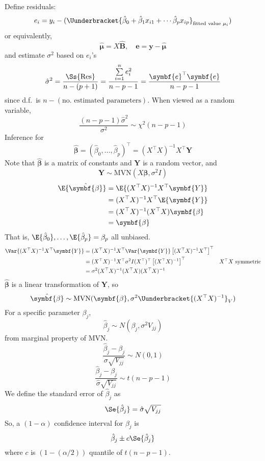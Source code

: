 Define residuals:
\[ e_i=y_i-(\Uunderbracket{\hat{\beta}_0+\hat{\beta}_1x_{i1}+\cdots\hat{\beta}_p x_{ip}
    }_{\text{fitted value }\mu_i}) \]
or equivalently,
\[ \hat{\symbf{\mu}}=X\hat{\symbf{B}},\quad \symbf{e}=\symbf{y}-\hat{\symbf{\mu}} \]
and estimate $ \sigma^2 $ based on $ e_i $'s
\[ \hat{\sigma}^2=\frac{\Ss{\text{Res}}}{n-(p+1)}=
    \frac{\sum\limits_{i=1}^{n} e_i^2}{n-p-1}=\frac{\symbf{e}^\top\symbf{e}}{n-p-1}  \]
since d.f.\ is $ n-(\text{no.\ estimated parameters}) $. When viewed
as a random variable,
\[ \frac{(n-p-1)\hat{\sigma}^2}{\sigma^2}\sim \chi^2(n-p-1)  \]
Inference for
\[ \hat{\symbf{\beta}}=(\hat{\beta}_0,\ldots,\hat{\beta}_p)^\top
    =(X^\top X)^{-1}X^\top \symbf{Y} \]
Note that $ \hat{\symbf{\beta}} $ is a matrix of constants and
$ \symbf{Y} $ is a random vector, and
\[ \symbf{Y}\sim \text{MVN}(X\symbf{\beta},\sigma^2 I) \]
\begin{align*}
    \E{\hat{\symbf{\beta}}}
     & =\E{(X^\top X)^{-1}X^\top \symbf{Y}}    \\
     & =(X^\top X)^{-1}X^\top\E{\symbf{Y}}     \\
     & =(X^\top X)^{-1}(X^\top X)\symbf{\beta} \\
     & =\symbf{\beta}
\end{align*}
That is, $ \E{\hat{\beta}_0},\ldots,\E{\hat{\beta}_p}=\beta_p $
all unbiased.
\begin{align*}
    \Var{(X^\top X)^{-1}X^\top\symbf{Y}}
     & =(X^\top X)^{-1}X^{\top}\Var{\symbf{Y}}\left[ (X^\top X)^{-1}X^\top \right]^\top                              \\
     & =(X^\top X)^{-1}X^\top \sigma^2 I(X^\top)^\top\left[ (X^\top X)^{-1} \right]^\top & X^\top X\text{ symmetric} \\
     & =\sigma^2(X^\top X)^{-1}(X^\top X)(X^\top X)^{-1}
\end{align*}
$ \hat{\symbf{\beta}} $ is a linear transformation of $ \symbf{Y} $, so
\[ \hat{\symbf{\beta}} \sim \text{MVN}(\symbf{\beta},\sigma^2
    \Uunderbracket{(X^\top X)^{-1}}_{V}) \]
For a specific parameter $ \beta_j $,
\[ \hat{\beta}_j \sim N(\beta_j,\sigma^2 V_{jj}) \]
from marginal property of MVN.\
\[ \frac{\hat{\beta}_j-\beta_j}{\sigma\sqrt{V_{jj}}} \sim N(0,1)  \]
\[ \frac{\hat{\beta}_j-\beta_j}{\hat{\sigma}\sqrt{V_{jj}}} \sim t(n-p-1)  \]
We define the standard error of $ \hat{\beta}_j $ as
\[ \Se{\hat{\beta}_j}=\hat{\sigma}\sqrt{V_{jj}} \]
So, a $ (1-\alpha) $ confidence interval for $ \beta_j $
is
\[ \hat{\beta}_j\pm c\Se{\hat{\beta}_j} \]
where $ c $ is $ (1-(\alpha/2)) $ quantile of $ t(n-p-1) $.

